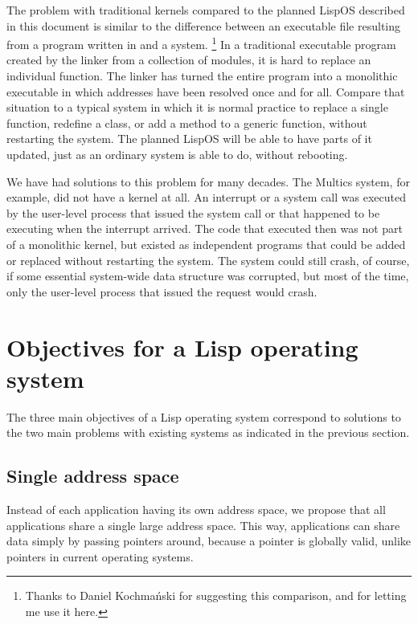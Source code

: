 The problem with traditional kernels compared to the planned LispOS
described in this document is similar to the difference between an
executable file resulting from a program written in \clanguage{} and a
\commonlisp{} system.%
\footnote{Thanks to Daniel Kochmański for suggesting this comparison,
  and for letting me use it here.}  In a traditional executable
program created by the linker from a collection of modules, it is hard
to replace an individual function.  The linker has turned the entire
program into a monolithic executable in which addresses have been
resolved once and for all.  Compare that situation to a typical
\commonlisp{} system in which it is normal practice to replace a
single function, redefine a class, or add a method to a generic
function, without restarting the \commonlisp{} system.  The planned
LispOS will be able to have parts of it updated, just as an ordinary
\commonlisp{} system is able to do, without rebooting.

We have had solutions to this problem for many decades. The Multics
system, for example, did not have a kernel at all. An interrupt or a
system call was executed by the user-level process that issued the
system call or that happened to be executing when the interrupt
arrived. The code that executed then was not part of a monolithic
kernel, but existed as independent programs that could be added or
replaced without restarting the system. The system could still crash,
of course, if some essential system-wide data structure was corrupted,
but most of the time, only the user-level process that issued the
request would crash.


\section{Objectives for a Lisp operating system}

The three main objectives of a Lisp operating system correspond to
solutions to the two main problems with existing systems as indicated
in the previous section.

\subsection{Single address space}

Instead of each application having its own address space, we propose
that all applications share a single large address space.  This way,
applications can share data simply by passing pointers around,
because a pointer is globally valid, unlike pointers in current
operating systems. 

